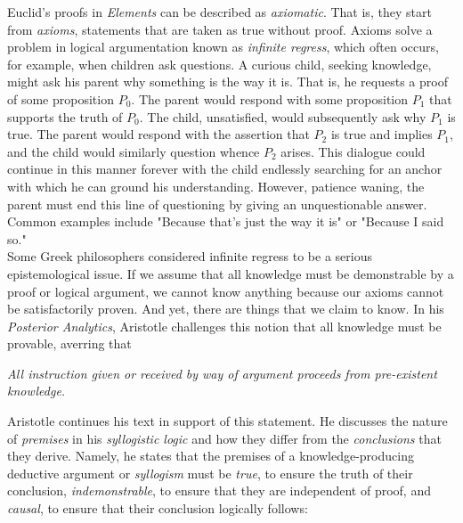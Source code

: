 \begin{tcolorbox}[breakable, enhanced, colback=textbook-blue, sharp corners]
	Euclid's proofs in \textit{Elements} can be described as \textit{axiomatic}. That is, they start from \textit{axioms}, statements that are taken as true without proof. Axioms solve a problem in logical argumentation known as \textit{infinite regress}, which often occurs, for example, when children ask questions. A curious child, seeking knowledge, might ask his parent why something is the way it is. That is, he requests a proof of some proposition $P_0$. The parent would respond with some proposition $P_1$ that supports the truth of $P_0$. The child, unsatisfied, would subsequently ask why $P_1$ is true. The parent would respond with the assertion that $P_2$ is true and implies $P_1$, and the child would similarly question whence $P_2$ arises. This dialogue could continue in this manner forever with the child endlessly searching for an anchor with which he can ground his understanding. However, patience waning, the parent must end this line of questioning by giving an unquestionable answer. Common examples include "Because that's just the way it is" or "Because I said so." \\
	
	Some Greek philosophers considered infinite regress to be a serious epistemological issue. If we assume that all knowledge must be demonstrable by a proof or logical argument, we cannot know anything because our axioms cannot be satisfactorily proven. And yet, there are things that we claim to know. In his \textit{Posterior Analytics}, Aristotle challenges this notion that all knowledge must be provable, averring that \\
	
	\begin{displayquote}
		\textit{All instruction given or received by way of argument proceeds from pre-existent knowledge.}
		\vspace{4mm}
	\end{displayquote} 
	
	Aristotle continues his text in support of this statement. He discusses the nature of \textit{premises} in his \textit{syllogistic logic} and how they differ from the \textit{conclusions} that they derive. Namely, he states that the premises of a knowledge-producing deductive argument or \textit{syllogism} must be \textit{true}, to ensure the truth of their conclusion, \textit{indemonstrable}, to ensure that they are independent of proof, and \textit{causal}, to ensure that their conclusion logically follows: \\
	

\end{tcolorbox}
